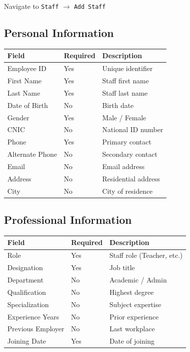 \documentclass[12pt,a4paper]{report}
\begin{document}
Navigate to \texttt{Staff} $\rightarrow$ \texttt{Add Staff}

\subsection{Personal Information}

\begin{longtable}{@{}p{4cm}p{3cm}p{6cm}@{}}
\toprule
\textbf{Field} & \textbf{Required} & \textbf{Description} \\
\midrule
\endhead
Employee ID & Yes & Unique identifier \\
First Name & Yes & Staff first name \\
Last Name & Yes & Staff last name \\
Date of Birth & No & Birth date \\
Gender & Yes & Male / Female \\
CNIC & No & National ID number \\
Phone & Yes & Primary contact \\
Alternate Phone & No & Secondary contact \\
Email & No & Email address \\
Address & No & Residential address \\
City & No & City of residence \\
\bottomrule
\end{longtable}

\subsection{Professional Information}

\begin{longtable}{@{}p{4cm}p{3cm}p{6cm}@{}}
\toprule
\textbf{Field} & \textbf{Required} & \textbf{Description} \\
\midrule
\endhead
Role & Yes & Staff role (Teacher, etc.) \\
Designation & Yes & Job title \\
Department & No & Academic / Admin \\
Qualification & No & Highest degree \\
Specialization & No & Subject expertise \\
Experience Years & No & Prior experience \\
Previous Employer & No & Last workplace \\
Joining Date & Yes & Date of joining \\
\bottomrule
\end{longtable}
\end{document}
